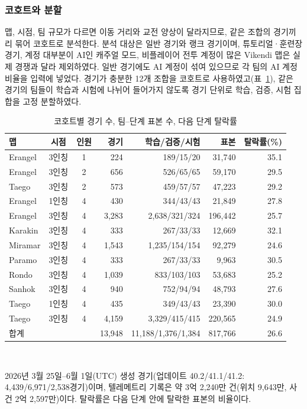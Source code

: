 \subsubsection{코호트와 분할}
\label{sec:method:cohort}
맵, 시점, 팀 규모가 다르면 이동 거리와 교전 양상이 달라지므로, 같은 조합의 경기끼리 묶어 코호트로 분석한다.
분석 대상은 일반 경기와 랭크 경기이며, 튜토리얼·훈련장 경기, 계정 대부분이 AI인 캐주얼 모드, 비플레이어 전투 계정이 많은 Vikendi 맵은 실제 경쟁과 달라 제외하였다.
일반 경기에도 AI 계정이 섞여 있으므로 각 팀의 AI 계정 비율을 입력에 넣었다.
경기가 충분한 12개 조합을 코호트로 사용하였고(표~\ref{tab:cohorts}), 같은 경기의 팀들이 학습과 시험에 나뉘어 들어가지 않도록 경기 단위로 학습, 검증, 시험 집합을  고정 분할하였다.

\begin{table}[t]
\centering
\caption{코호트별 경기 수, 팀--단계 표본 수, 다음 단계 탈락률}
\label{tab:cohorts}
\footnotesize
\setlength{\tabcolsep}{2.7pt}
\begin{tabular}{lccrrrr}
\hline
맵 & 시점 & 인원 & 경기 & 학습/검증/시험 & 표본 & 탈락률(\%) \\
\hline
Erangel & 3인칭 & 1 & 224 & 189/15/20 & 31,740 & 35.1 \\
Erangel & 3인칭 & 2 & 656 & 526/65/65 & 59,170 & 29.5 \\
Taego & 3인칭 & 2 & 573 & 459/57/57 & 47,223 & 29.2 \\
Erangel & 1인칭 & 4 & 430 & 344/43/43 & 21,849 & 27.8 \\
Erangel & 3인칭 & 4 & 3,283 & 2,638/321/324 & 196,442 & 25.7 \\
Karakin & 3인칭 & 4 & 333 & 267/33/33 & 12,669 & 32.1 \\
Miramar & 3인칭 & 4 & 1,543 & 1,235/154/154 & 92,279 & 24.6 \\
Paramo & 3인칭 & 4 & 333 & 267/33/33 & 9,963 & 30.5 \\
Rondo & 3인칭 & 4 & 1,039 & 833/103/103 & 53,683 & 25.2 \\
Sanhok & 3인칭 & 4 & 940 & 752/94/94 & 48,793 & 27.6 \\
Taego & 1인칭 & 4 & 435 & 349/43/43 & 23,390 & 30.0 \\
Taego & 3인칭 & 4 & 4,159 & 3,329/415/415 & 220,565 & 24.9 \\
\hline
합계 & & & 13,948 & 11,188/1,376/1,384 & 817,766 & 26.6 \\
\hline
\end{tabular}
\\[2pt]
\parbox{\columnwidth}{\scriptsize 2026년 3월 25일--6월 1일(UTC) 생성 경기(업데이트 40.2/41.1/41.2: 4,439/6,971/2,538경기)이며, 텔레메트리 기록은 약 3억 2,240만 건(위치 9,643만, 사건 2억 2,597만)이다. 탈락률은 다음 단계 안에 탈락한 표본의 비율이다.}
\end{table}

